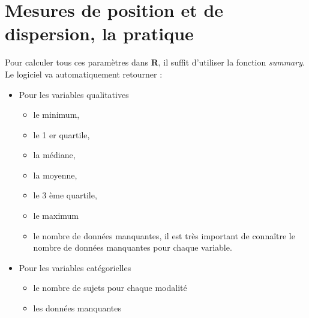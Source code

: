 \section{Mesures de position et de dispersion, la pratique}
Pour calculer tous ces paramètres dans \textbf{R}, il suffit d'utiliser la fonction \textit{summary}. Le logiciel va automatiquement retourner : 
\begin{itemize}
\item Pour les variables qualitatives
\begin{itemize}
\item le minimum,
\item le 1 er quartile,
\item la médiane,
\item la moyenne,
\item le 3 ème quartile,
\item le maximum
\item le nombre de données manquantes, il est très important de connaître le nombre de données manquantes pour chaque variable.
\end{itemize}
\item Pour les variables catégorielles

\begin{itemize}
\item le nombre de sujets pour chaque modalité
\item les données manquantes
\end{itemize}
\end{itemize}
